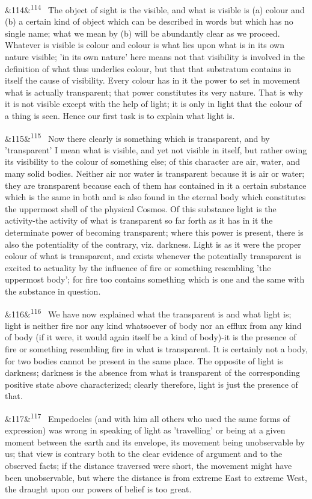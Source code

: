 \documentclass[12pt]{article}
\newcommand{\para}[1][]{\par\noindent\ifx&#1&\else\textsuperscript{\footnotesize #1}~\fi}
\begin{document}
\para[114] The object of sight is the visible, and what is visible is (a) colour and (b) a certain kind of object which can be described in words but which has no single name; what we mean by (b) will be abundantly clear as we proceed. Whatever is visible is colour and colour is what lies upon what is in its own nature visible; 'in its own nature' here means not that visibility is involved in the definition of what thus underlies colour, but that that substratum contains in itself the cause of visibility. Every colour has in it the power to set in movement what is actually transparent; that power constitutes its very nature. That is why it is not visible except with the help of light; it is only in light that the colour of a thing is seen. Hence our first task is to explain what light is.

\para[115] Now there clearly is something which is transparent, and by 'transparent' I mean what is visible, and yet not visible in itself, but rather owing its visibility to the colour of something else; of this character are air, water, and many solid bodies. Neither air nor water is transparent because it is air or water; they are transparent because each of them has contained in it a certain substance which is the same in both and is also found in the eternal body which constitutes the uppermost shell of the physical Cosmos. Of this substance light is the activity-the activity of what is transparent so far forth as it has in it the determinate power of becoming transparent; where this power is present, there is also the potentiality of the contrary, viz. darkness. Light is as it were the proper colour of what is transparent, and exists whenever the potentially transparent is excited to actuality by the influence of fire or something resembling 'the uppermost body'; for fire too contains something which is one and the same with the substance in question.

\para[116] We have now explained what the transparent is and what light is; light is neither fire nor any kind whatsoever of body nor an efflux from any kind of body (if it were, it would again itself be a kind of body)-it is the presence of fire or something resembling fire in what is transparent. It is certainly not a body, for two bodies cannot be present in the same place. The opposite of light is darkness; darkness is the absence from what is transparent of the corresponding positive state above characterized; clearly therefore, light is just the presence of that.

\para[117] Empedocles (and with him all others who used the same forms of expression) was wrong in speaking of light as 'travelling' or being at a given moment between the earth and its envelope, its movement being unobservable by us; that view is contrary both to the clear evidence of argument and to the observed facts; if the distance traversed were short, the movement might have been unobservable, but where the distance is from extreme East to extreme West, the draught upon our powers of belief is too great.
\end{document}
